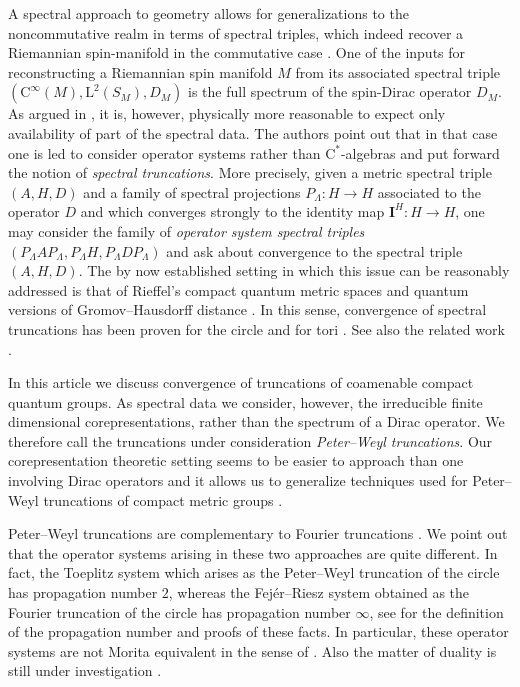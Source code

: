 \documentclass{amsart}
\theoremstyle{plain}
\theoremstyle{definition}
\theoremstyle{remark}
\begin{document}
	A spectral approach to geometry allows for generalizations to the noncommutative realm \cite{Con94} in terms of spectral triples, which indeed recover a Riemannian spin-manifold in the commutative case \cite{Con96, Con13}.
	One of the inputs for reconstructing a Riemannian spin manifold $M$ from its associated spectral triple $(\mathrm{C}^\infty(M),\mathrm{L}^2(S_M),D_M)$ is the full spectrum of the spin-Dirac operator $D_M$.
	As argued in \cite{CvS21}, it is, however, physically more reasonable to expect only availability of part of the spectral data.
	The authors point out that in that case one is led to consider operator systems rather than $\mathrm{C}^*$-algebras and put forward the notion of \emph{spectral truncations}.
	More precisely, given a metric spectral triple $(A,H,D)$ and a family of spectral projections $P_\Lambda : H \rightarrow H$ associated to the operator $D$ and which converges strongly to the identity map $\mathbf{I}^H : H \rightarrow H$, one may consider the family of \emph{operator system spectral triples} $(P_\Lambda A P_\Lambda,P_\Lambda H,P_\Lambda D P_\Lambda)$ and ask about convergence to the spectral triple $(A,H,D)$.
	The by now established setting in which this issue can be reasonably addressed is that of Rieffel's compact quantum metric spaces \cite{Rie98, Rie99} and quantum versions of Gromov--Hausdorff distance \cite{Rie04, Ker03, KL07}.
	In this sense, convergence of spectral truncations has been proven for the circle \cite{vS21} and for tori \cite{LvS24}.
	See also the related work \cite{Toy23}.
	
	In this article we discuss convergence of truncations of coamenable compact quantum groups.
	As spectral data we consider, however, the irreducible finite dimensional corepresentations, rather than the spectrum of a Dirac operator.
	We therefore call the truncations under consideration \emph{Peter--Weyl truncations}.
	Our corepresentation theoretic setting seems to be easier to approach than one involving Dirac operators and it allows us to generalize techniques used for Peter--Weyl truncations of compact metric groups \cite{GEvS23}.
	
	Peter--Weyl truncations are complementary to Fourier truncations \cite{Rie23}.
	We point out that the operator systems arising in these two approaches are quite different.
	In fact, the Toeplitz system which arises as the Peter--Weyl truncation of the circle has propagation number $2$, whereas the Fejér--Riesz system obtained as the Fourier truncation of the circle has propagation number $\infty$, see \cite{CvS21} for the definition of the propagation number and proofs of these facts.
	In particular, these operator systems are not Morita equivalent in the sense of \cite{EKT22}.
	Also the matter of duality is still under investigation \cite[Subsection 4.2]{LvS24}.
	
\end{document}
